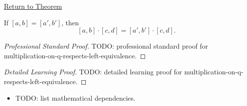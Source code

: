 \newpage
{}
\label{prf:multiplication-on-q-respects-left-equivalence}

\begin{remark*}[Return]
\hyperref[lem:multiplication-on-q-respects-left-equivalence]{Return to Theorem}
\end{remark*}

\begin{lemma*}
If $[a,b]=[a',b']$, then
\[
[a,b]\cdot[c,d]=[a',b']\cdot[c,d].
\]
\end{lemma*}

\begin{proof}[Professional Standard Proof]
\LRAProofBodyStart
TODO: professional standard proof for multiplication-on-q-respects-left-equivalence.
\end{proof}

\begin{proof}[Detailed Learning Proof]
\LRAProofBodyStart
TODO: detailed learning proof for multiplication-on-q-respects-left-equivalence.
\end{proof}

\begin{remark*}
\end{remark*}

\begin{dependencies}
\begin{itemize}
  \item TODO: list mathematical dependencies.
\end{itemize}
\end{dependencies}

\clearpage
